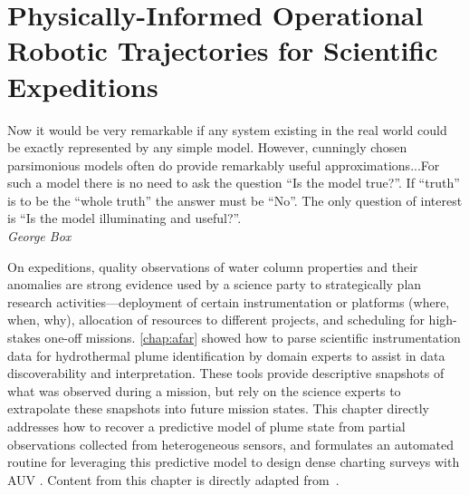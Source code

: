 \chapter{Physically-Informed Operational Robotic Trajectories for Scientific Expeditions}
\label{chap:phortex}

\begin{center}
    \begin{minipage}{0.7\textwidth}
      \begin{small}
        Now it would be very remarkable if any system existing in the real world could be exactly represented by any simple model. However, cunningly chosen parsimonious models often do provide remarkably useful approximations...For such a model there is no need to ask the question ``Is the model true?''. If ``truth'' is to be the ``whole truth'' the answer must be ``No''. The only question of interest is ``Is the model illuminating and useful?''.\\ \emph{George Box}
      \end{small}
    \end{minipage}
    \vspace{0.5cm}
\end{center}


On expeditions, quality observations of water column properties and their anomalies are strong evidence used by a science party to strategically plan research activities---deployment of certain instrumentation or platforms (where, when, why), allocation of resources to different projects, and scheduling for high-stakes one-off missions. \cref{chap:afar} showed how to parse scientific instrumentation data for hydrothermal plume identification by domain experts to assist in data discoverability and interpretation. These tools provide descriptive snapshots of what was observed during a mission, but rely on the science experts to extrapolate these snapshots into future mission states. This chapter directly addresses how to recover a predictive model of plume state from partial observations collected from heterogeneous sensors, and formulates an automated routine for leveraging this predictive model to design dense charting surveys with AUV \Sentry. Content from this chapter is directly adapted from~\cite{preston2022physically}.


